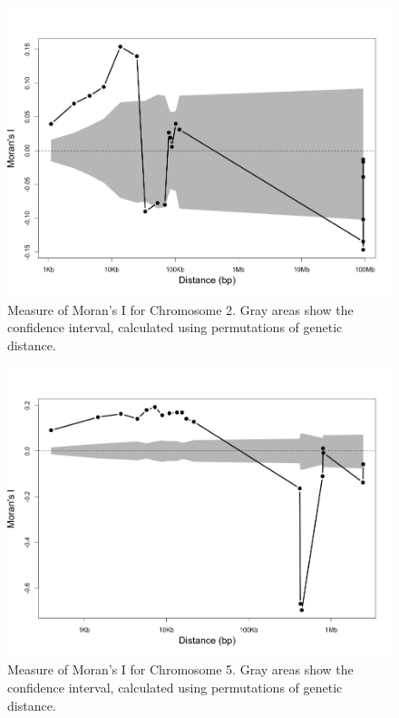 \begin{figure}[h!]
\includegraphics[width=1\textwidth]{Suppl_Chr02_Rspagedi.jpeg}
\caption{Measure of Moran's I for Chromosome 2.  Gray areas show the confidence interval, calculated using permutations of genetic distance.}
\label{Supp_SpagediChr02}    
\end{figure}

\begin{figure}[h!]
\includegraphics[width=1\textwidth]{Suppl_Chr05_Rspagedi.jpeg}
\caption{Measure of Moran's I for Chromosome 5.  Gray areas show the confidence interval, calculated using permutations of genetic distance.}
\label{Supp_SpagediChr05}    
\end{figure}

